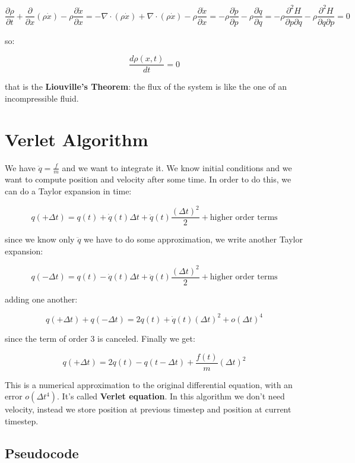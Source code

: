 \documentclass[a4paper, italian, openany]{book}
\begin{document}
\begin{itemize}
$$\frac{\partial \rho}{\partial t} + \frac{\partial}{\partial x} (\rho \dot{x} ) - \rho \frac{\partial \dot{x}}{\partial x} = -\nabla \cdot (\rho \dot{x}) + \nabla \cdot (\rho \dot{x}) - \rho \frac{\partial \dot{x}}{\partial x} = -\rho\frac{\partial \dot{p}}{\partial p} - \rho \frac{\partial \dot{q}}{\partial q} = -\rho\frac{\partial^2 H}{\partial p \partial q} - \rho \frac{\partial^2 H}{\partial q \partial p} = 0$$

so:

$$\frac{d\rho (x, t)}{dt} = 0$$

that is the \textbf{Liouville's Theorem}: the flux of the system is like the one of an incompressible fluid.

\end{itemize}

\section{Verlet Algorithm}

We have $\ddot{q} = \frac{f}{m}$ and we want to integrate it. We know initial conditions and we want to compute position and velocity after some time. In order to do this, we can do a Taylor expansion in time:

$$q( +\Delta t) = q(t) + \dot{q}(t) \Delta t + \ddot{q} (t) \frac{(\Delta t)^2}{2} + \mbox{higher order terms}$$

since we know only $\ddot{q}$ we have to do some approximation, we write another Taylor expansion:

$$q( -\Delta t) = q(t) - \dot{q}(t) \Delta t + \ddot{q} (t) \frac{(\Delta t)^2}{2} + \mbox{higher order terms}$$

adding one another:

$$q( +\Delta t)  + q( -\Delta t) = 2q(t) +\dot{q}(t)(\Delta t)^2 + o(\Delta t)^4$$

since the term of order 3 is canceled. Finally we get:

$$q( +\Delta t) = 2q(t) -q(t - \Delta t) + \frac{f(t)}{m} (\Delta t)^2$$

This is a numerical approximation to the original differential equation, with an error $o(\Delta t^4)$. It's called \textbf{Verlet equation}.\newline
In this algorithm we don't need velocity, instead we store position at previous timestep and position at current timestep.

\subsection{Pseudocode}
\end{document}
